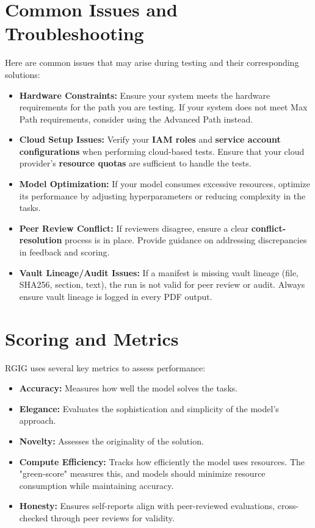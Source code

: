 \section*{Common Issues and Troubleshooting}
Here are common issues that may arise during testing and their corresponding solutions:

\begin{itemize}
  \item \textbf{Hardware Constraints:} Ensure your system meets the hardware requirements for the path you are testing. If your system does not meet Max Path requirements, consider using the Advanced Path instead.
  \item \textbf{Cloud Setup Issues:} Verify your \textbf{IAM roles} and \textbf{service account configurations} when performing cloud-based tests. Ensure that your cloud provider's \textbf{resource quotas} are sufficient to handle the tests.
  \item \textbf{Model Optimization:} If your model consumes excessive resources, optimize its performance by adjusting hyperparameters or reducing complexity in the tasks.
  \item \textbf{Peer Review Conflict:} If reviewers disagree, ensure a clear \textbf{conflict-resolution} process is in place. Provide guidance on addressing discrepancies in feedback and scoring.
  \item \textbf{Vault Lineage/Audit Issues:} If a manifest is missing vault lineage (file, SHA256, section, text), the run is not valid for peer review or audit. Always ensure vault lineage is logged in every PDF output.
\end{itemize}

\section*{Scoring and Metrics}
RGIG uses several key metrics to assess performance:

\begin{itemize}
  \item \textbf{Accuracy:} Measures how well the model solves the tasks.
  \item \textbf{Elegance:} Evaluates the sophistication and simplicity of the model's approach.
  \item \textbf{Novelty:} Assesses the originality of the solution.
  \item \textbf{Compute Efficiency:} Tracks how efficiently the model uses resources. The "green-score" measures this, and models should minimize resource consumption while maintaining accuracy.
  \item \textbf{Honesty:} Ensures self-reports align with peer-reviewed evaluations, cross-checked through peer reviews for validity.
\end{itemize}

